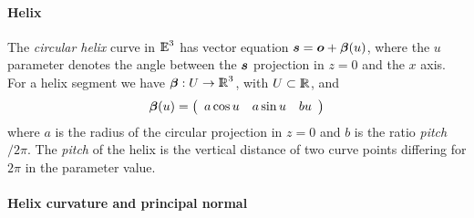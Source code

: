 \documentclass{31x47jw}
\begin{document}
% 
% 
% 
% 

% 

\paragraph{Helix}

The \emph{circular helix}  curve in $\mathbb{I\!\!E}^{3}$ has
vector equation ${\mbox{\boldmath $s$}} = {\mbox{\boldmath $o$}}+{\mbox{\boldmath $\beta$}}(u)$, where the $u$ parameter
denotes the angle between the ${\mbox{\boldmath $s$}}$ projection in $z=0$ and the $x$
axis.  For a helix segment we have ${\mbox{\boldmath $\beta$}}:U\rightarrow\mathbb{I\!\!R}^{3}$,
with $U\subset\mathbb{I\!\!R}$, and
\begin{equation}
{\mbox{\boldmath $\beta$}}(u) = {\left(\begin{array}{cccccccc}a\cos u & a\sin u  &b u \end{array}\right)} 
\label{eq:5:helix}
\end{equation}
where $a$ is the radius of the circular projection in $z=0$ and $b$ is
the ratio \emph{pitch}$/2\pi$.  The \emph{pitch} of the helix is the
vertical distance of two curve points differing for $2\pi$ in the
parameter value.



\paragraph{Helix curvature and principal normal}
    
\end{document}
